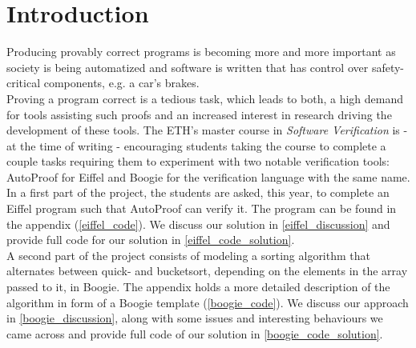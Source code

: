 \section{Introduction}
Producing provably correct programs is becoming more and more important as society is being automatized and software is written that has control over safety-critical components, e.g. a car's brakes.\\

Proving a program correct is a tedious task, which leads to both, a high demand for tools assisting such proofs and an increased interest in research driving the development of these tools. The ETH's master course in \emph{Software Verification} is - at the time of writing - encouraging students taking the course to complete a couple tasks requiring them to experiment with two notable verification tools: AutoProof\cite{autoproof} for Eiffel and Boogie\cite{boogie} for the verification language with the same name.\\

In a first part of the project, the students are asked, this year, to complete an Eiffel program such that AutoProof can verify it. The program can be found in the appendix (\ref{eiffel_code}). We discuss our solution in \autoref{eiffel_discussion} and provide full code for our solution in \autoref{eiffel_code_solution}.\\

A second part of the project consists of modeling a sorting algorithm that alternates between quick- and bucketsort, depending on the elements in the array passed to it, in Boogie. The appendix holds a more detailed description of the algorithm in form of a Boogie template (\ref{boogie_code}). We discuss our approach in \autoref{boogie_discussion}, along with some issues and interesting behaviours we came across and provide full code of our solution in \autoref{boogie_code_solution}.
